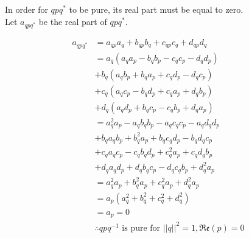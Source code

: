 \documentclass[12pt, a4paper]{article}
\begin{document}
In order for $qpq^*$ to be pure, its real part must be equal to zero. \\
Let $a_{qpq^*}$ be the real part of $qpq^*$.

\begin{align*}
    a_{qpq^*} & = a_{qp}a_q + b_{qp}b_q + c_{qp}c_q + d_{qp}d_q                            \\
              & = a_q(a_qa_p - b_qb_p - c_qc_p - d_qd_p)                                   \\
              & + b_q(a_qb_p + b_qa_p + c_qd_p - d_qc_p)                                   \\
              & + c_q(a_qc_p - b_qd_p + c_qa_p + d_qb_p)                                   \\
              & + d_q(a_qd_p + b_qc_p - c_qb_p + d_qa_p)                                   \\
              & =a_q^2a_p - a_qb_qb_p - a_qc_qc_p - a_qd_qd_p                              \\
              & + b_qa_qb_p + b_q^2a_p + b_qc_qd_p - b_qd_qc_p                             \\
              & + c_qa_qc_p - c_qb_qd_p + c_q^2a_p + c_qd_qb_p                             \\
              & + d_qa_qd_p + d_qb_qc_p - d_qc_qb_p + d_q^2a_p                             \\
              & = a_q^2a_p + b_q^2a_p + c_q^2a_p + d_q^2a_p                                \\
              & = a_p(a_q^2 + b_q^2 + c_q^2 + d_q^2)                                       \\
              & = a_p = 0                                                                  \\
              & \therefore qpq^{-1} \text{ is pure for } ||q||^2 = 1, \mathfrak{Re}(p) = 0
\end{align*}
\end{document}
